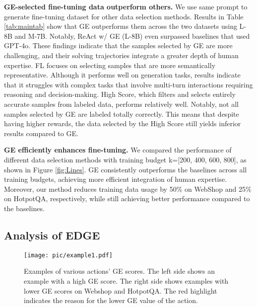 \textbf{GE-selected fine-tuning data outperform others.} We use same prompt to generate fine-tuning dataset for other data selection methods. Results in Table \ref{tab:maintab} show that GE outperforms them across the two datasets using L-8B and M-7B. Notably, ReAct w/ GE (L-8B) even surpassed  baselines that used GPT-4o. These findings indicate that the samples selected by GE are more challenging, and their solving trajectories integrate a greater depth of human expertise. 
FL focuses on selecting samples that are more semantically representative. Although it performs well on generation tasks, results indicate that it struggles with complex tasks that involve multi-turn interactions requiring reasoning and decision-making.
High Score, which filters and selects entirely accurate samples from labeled data, performs relatively well. Notably, not all samples selected by GE are labeled totally correctly. This means that despite having higher rewards, the data selected by the High Score still yields inferior results compared to GE.

\textbf{GE efficiently enhances fine-tuning.} We compared the performance of different data selection methods with training budget  k=[200, 400, 600, 800], as shown in Figure \ref{fig:Lines}. GE consistently outperforms the baselines across all training budgets, achieving more efficient integration of human expertise. Moreover, our method reduces training data usage by 50\% on WebShop and 25\% on HotpotQA, respectively, while still achieving better performance compared to the baselines.


\subsection{Analysis of EDGE}\label{sec:4-4}

\begin{figure*}[ht]
    \centering
    \texttt{[image: pic/example1.pdf]}
    \caption{Examples of various actions' GE scores. The left side shows an example with a high GE score. The right side shows examples with lower GE scores on Webshop and HotpotQA. The red highlight indicates the reason for the lower GE value of the action.} 
    \label{fig:example}
\end{figure*}




